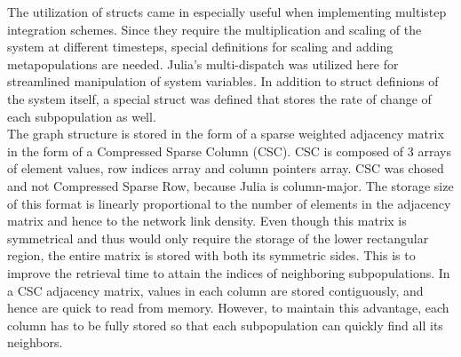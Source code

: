 The utilization of structs came in especially useful when implementing multistep integration schemes. Since they require the multiplication and scaling of the system at different timesteps, special definitions for scaling and adding metapopulations are needed. Julia's multi-dispatch was utilized here for streamlined manipulation of system variables. In addition to struct definions of the system itself, a special struct was defined that stores the rate of change of each subpopulation as well.\\

The graph structure is stored in the form of a sparse weighted adjacency matrix in the form of a Compressed Sparse Column (CSC).  CSC is composed of 3 arrays of element values, row indices array and column pointers array. CSC was chosed and not Compressed Sparse Row, because Julia is column-major. The storage size of this format is linearly proportional to the number of elements in the adjacency matrix and hence to the network link density. Even though this matrix is symmetrical and thus would only require the storage of the lower rectangular region, the entire matrix is stored with both its symmetric sides. This is to improve the retrieval time to attain the indices of neighboring subpopulations. In a CSC adjacency matrix, values in each column are stored contiguously, and hence are quick to read from memory. However, to maintain this advantage, each column has to be fully stored so that each subpopulation can quickly find all its neighbors.\\
\usetikzlibrary{matrix}
\usetikzlibrary{positioning}
